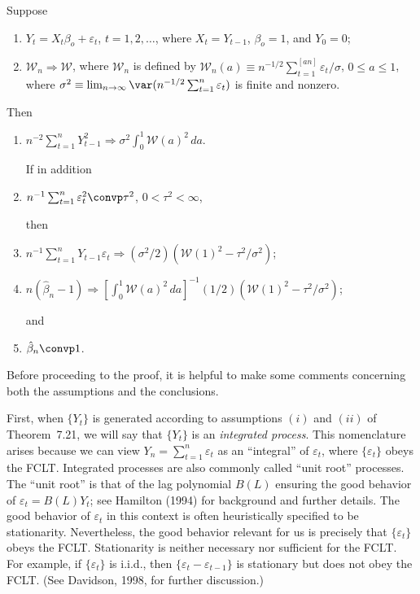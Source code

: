 \begin{theorem}\label{thm:unit-root}
Suppose
\begin{enumerate}[label=(\roman*)]
\item $Y_t = X_t \beta_o + \varepsilon_t$, $t = 1, 2, \ldots$, where $X_t = Y_{t-1}$, $\beta_o = 1$, and $Y_0 = 0$;
\item $\mathcal{W}_n \Rightarrow \mathcal{W}$, where $\mathcal{W}_n$ is defined by $\mathcal{W}_n(a) \equiv n^{-1/2}\sum_{t=1}^{[an]} \varepsilon_t / \sigma$, $0 \leq a \leq 1$, where $\sigma^2 \equiv \lim_{n\to\infty} \var(n^{-1/2}\sum_{t=1}^{n} \varepsilon_t)$ is finite and nonzero.
\end{enumerate}

Then
\begin{enumerate}[label=(\alph*)]
\item $n^{-2}\sum_{t=1}^{n} Y_{t-1}^2 \Rightarrow \sigma^2 \int_0^1 \mathcal{W}(a)^2\,da$.

\noindent If in addition
\item[\emph{(iii)}] $n^{-1}\sum_{t=1}^{n} \varepsilon_t^2 \convp \tau^2$, $0 < \tau^2 < \infty$,

\noindent then
\item $n^{-1}\sum_{t=1}^{n} Y_{t-1}\varepsilon_t \Rightarrow (\sigma^2/2)\left(\mathcal{W}(1)^2 - \tau^2/\sigma^2\right)$;
\item $n(\hat{\beta}_n - 1) \Rightarrow \left[\int_0^1 \mathcal{W}(a)^2\,da\right]^{-1}(1/2)\left(\mathcal{W}(1)^2 - \tau^2/\sigma^2\right)$;

\noindent and
\item $\hat{\beta}_n \convp 1$.
\end{enumerate}
\end{theorem}

Before proceeding to the proof, it is helpful to make some comments concerning both the assumptions and the conclusions.

First, when $\{Y_t\}$ is generated according to assumptions $(i)$ and $(ii)$ of Theorem~7.21, we will say that $\{Y_t\}$ is an \emph{integrated process}. This nomenclature arises because we can view $Y_n = \sum_{t=1}^{n} \varepsilon_t$ as an ``integral'' of $\varepsilon_t$, where $\{\varepsilon_t\}$ obeys the FCLT. Integrated processes are also commonly called ``unit root'' processes. The ``unit root'' is that of the lag polynomial $B(L)$ ensuring the good behavior of $\varepsilon_t = B(L)Y_t$; see Hamilton (1994) for background and further details. The good behavior of $\varepsilon_t$ in this context is often heuristically specified to be stationarity. Nevertheless, the good behavior relevant for us is precisely that $\{\varepsilon_t\}$ obeys the FCLT. Stationarity is neither necessary nor sufficient for the FCLT. For example, if $\{\varepsilon_t\}$ is i.i.d., then $\{\varepsilon_t - \varepsilon_{t-1}\}$ is stationary but does not obey the FCLT. (See Davidson, 1998, for further discussion.)

